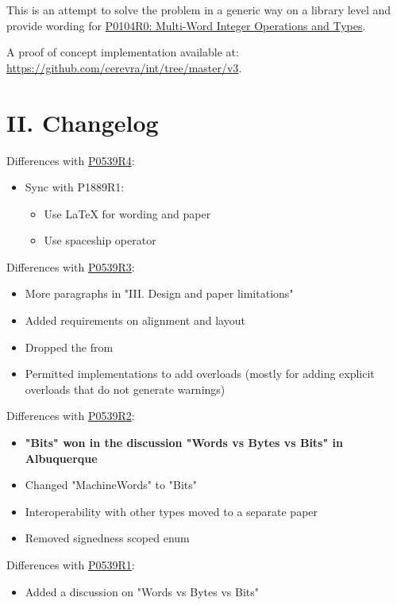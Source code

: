 \documentclass[ebook,10pt,oneside,openany,final]{memoir}
\begin{document}
This is an attempt to solve the problem in a generic way on a library level and provide wording for \href{https://wg21.link/P0104R0}{P0104R0: Multi-Word Integer Operations and Types}.

A proof of concept implementation available at: \href{https://github.com/cerevra/int/tree/master/v3}{https://github.com/cerevra/int/tree/master/v3}. 



\section{II. Changelog}

Differences with \href{https://wg21.link/P0539R4}{P0539R4}:
\begin{itemize}
\item Sync with P1889R1:
    \begin{itemize}
    \item Use \LaTeX{} for wording and paper
    \item Use spaceship operator
    \end{itemize}
\end{itemize}

Differences with \href{https://wg21.link/P0539R3}{P0539R3}:
\begin{itemize}
\item More paragraphs in "III. Design and paper limitations"
\item Added requirements on  alignment and layout
\item Dropped the  from 
\item Permitted implementations to add overloads (mostly for adding explicit overloads that do not generate warnings)
\end{itemize}

Differences with \href{https://wg21.link/P0539R2}{P0539R2}:
\begin{itemize}
\item \textbf{"Bits" won in the discussion "Words vs Bytes vs Bits" in Albuquerque}
\item Changed "MachineWords" to "Bits"
\item Interoperability with other types moved to a separate paper
\item Removed signedness scoped enum
\end{itemize}

Differences with \href{https://wg21.link/P0539R1}{P0539R1}:
\begin{itemize}
\item Added a discussion on "Words vs Bytes vs Bits"
\end{itemize}
\end{document}
